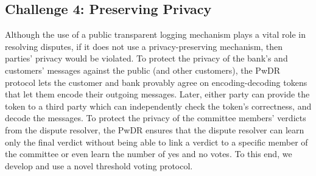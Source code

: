 \vspace{-3mm}
\subsection{Challenge 4: Preserving Privacy}
 Although the use of a public transparent logging mechanism plays a vital role in resolving disputes, if it does not use a  privacy-preserving mechanism, then  parties' privacy would be violated. To protect the  privacy of the bank's and customers' messages against the public (and other customers), the PwDR protocol lets the customer and bank provably agree on encoding-decoding tokens that let them  encode their outgoing messages. Later, either party can provide the token to a third party which can independently check the token's correctness, and decode the messages. To protect the privacy of the committee members' verdicts from the  dispute resolver, the PwDR   ensures that  the dispute resolver can learn only the final verdict without being able to link a verdict to a specific  member of the committee or even learn the number of yes and no votes. To this end, we develop and use a novel threshold voting protocol. 
 
 
 
 